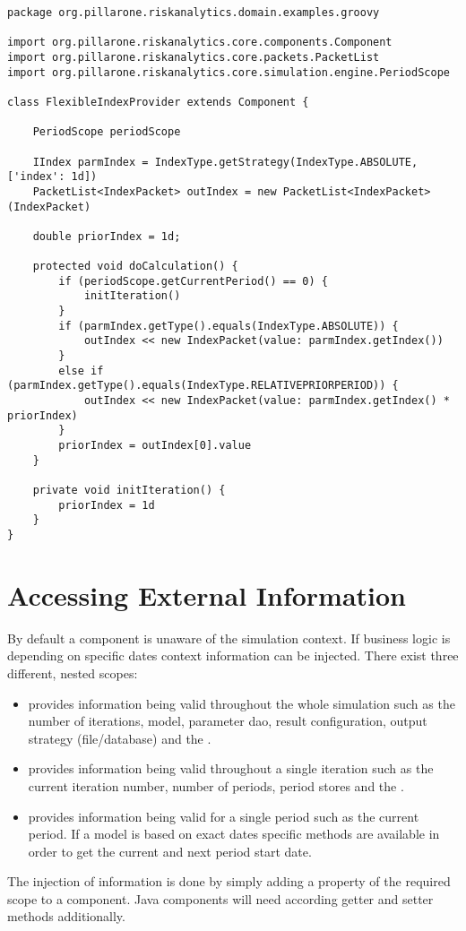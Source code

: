 \begin{lstlisting}[label=lst:flexibleindexprovider]
package org.pillarone.riskanalytics.domain.examples.groovy

import org.pillarone.riskanalytics.core.components.Component
import org.pillarone.riskanalytics.core.packets.PacketList
import org.pillarone.riskanalytics.core.simulation.engine.PeriodScope

class FlexibleIndexProvider extends Component {

    PeriodScope periodScope

    IIndex parmIndex = IndexType.getStrategy(IndexType.ABSOLUTE, ['index': 1d])
    PacketList<IndexPacket> outIndex = new PacketList<IndexPacket>(IndexPacket)

    double priorIndex = 1d;

    protected void doCalculation() {
        if (periodScope.getCurrentPeriod() == 0) {
            initIteration()
        }
        if (parmIndex.getType().equals(IndexType.ABSOLUTE)) {
            outIndex << new IndexPacket(value: parmIndex.getIndex())
        }
        else if (parmIndex.getType().equals(IndexType.RELATIVEPRIORPERIOD)) {
            outIndex << new IndexPacket(value: parmIndex.getIndex() * priorIndex)
        }
        priorIndex = outIndex[0].value
    }

    private void initIteration() {
        priorIndex = 1d
    }
}
\end{lstlisting}

\section{Accessing External Information}
\label{subsec:extinfo}

By default a component is unaware of the simulation context. If business logic is depending on specific dates context information can be injected. There exist three different, nested scopes:
\begin{itemize}
	\item {} provides information being valid throughout the whole simulation such as the number of iterations, model, parameter dao, result configuration, output strategy (file/database) and the .
	\item {} provides information being valid throughout a single iteration such as the current iteration number, number of periods, period stores and the .
	\item {} provides information being valid for a single period such as the current period. If a model is based on exact dates specific methods are available in order to get the current and next period start date.
\end{itemize}
The injection of information is done by simply adding a property of the required scope to a component. Java components will need according getter and setter methods additionally.

